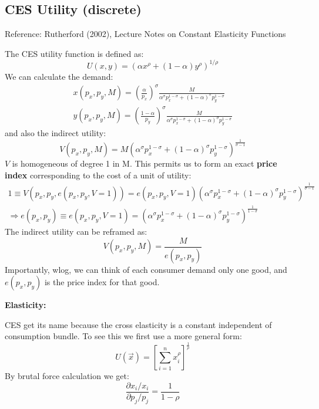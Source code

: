 \documentclass{book}
\theoremstyle{plain}
\theoremstyle{definition}
\newcommand{\mysubtitle}[1]{{\normalsize{\textbf{#1}}}}
\begin{document}
\subsection{CES Utility (discrete)} %
\label{sub:ces_utility_discrete}

Reference: Rutherford (2002), Lecture Notes on Constant Elasticity Functions

The CES utility function is defined as:
\[U ( x , y ) = \left( \alpha x ^ { \rho } + ( 1 - \alpha ) y ^ { \rho } \right) ^ { 1 / \rho }\]
We can calculate the demand:
\[\begin{array} { c } { x \left( p _ { x } , p _ { y } , M \right) = \left( \frac { \alpha } { p _ { x } } \right) ^ { \sigma } \frac { M } { \alpha ^ { \sigma } p _ { x } ^ { 1 - \sigma } + ( 1 - \alpha ) ^ { \sigma } p _ { y } ^ { 1 - \sigma } } } \\ { y \left( p _ { x } , p _ { y } , M \right) = \left( \frac { 1 - \alpha } { p _ { y } } \right) ^ { \sigma } \frac { M } { \alpha ^ { \sigma } p _ { x } ^ { 1 - \sigma } + ( 1 - \alpha ) ^ { \sigma } p _ { y } ^ { 1 - \sigma } } } \end{array}\]
and also the indirect utility:
\[V \left( p _ { x } , p _ { y } , M \right) = M \left( \alpha ^ { \sigma } p _ { x } ^ { 1 - \sigma } + ( 1 - \alpha ) ^ { \sigma } p _ { y } ^ { 1 - \sigma } \right) ^ { \frac { 1 } { \sigma - 1 } }\]
$V$ is homogeneous of degree 1 in M. This permits us to form an exact \textbf{price index} corresponding to the cost of a unit of utility:
\begin{align*}
	1 \equiv V(p_x,p_y,e(p_x,p_y,V=1)) = e(p_x,p_y,V=1)\left( \alpha ^ { \sigma } p _ { x } ^ { 1 - \sigma } + ( 1 - \alpha ) ^ { \sigma } p _ { y } ^ { 1 - \sigma } \right) ^ { \frac { 1 } { \sigma - 1 } } \\
	\Rightarrow e(p_x,p_y) \equiv e(p_x,p_y,V=1) = 
	\left( \alpha ^ { \sigma } p _ { x } ^ { 1 - \sigma } + ( 1 - \alpha ) ^ { \sigma } p _ { y } ^ { 1 - \sigma } \right) ^ { \frac { 1 } {1- \sigma } }
\end{align*}
The indirect utility can be reframed as:
\[V(p_x,p_y,M) = \frac{M}{e(p_x,p_y)}\]
Importantly, wlog, we can think of each consumer demand only one good, and $e(p_x,p_y)$ is the price index for that good.


\mysubtitle{Elasticity:}

CES get its name because the cross elasticity is a constant independent of consumption bundle. To see this we first use a more general form:
\[U(\vec x) = \left[ \sum_{i=1}^n x_i^\rho \right]^{\frac{1}{\rho}}\]
By brutal force calculation we get:
\[\frac{\partial x_i/ x_i}{\partial p_j / p_j} = \frac{1}{1-\rho}\]
\end{document}
